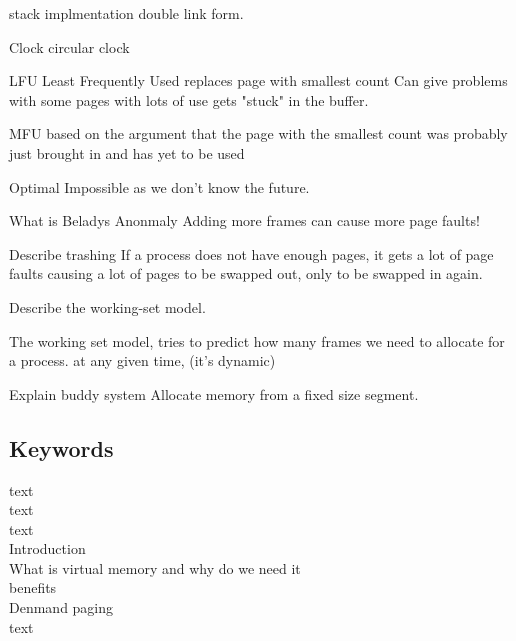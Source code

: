 \documentclass[a4paper,10pt,titlepage]{report}
\begin{document}
stack implmentation 
    double link form.
    
    
    
Clock
circular clock 



LFU
Least Frequently Used
replaces page with smallest count
Can give problems with some pages with lots of use gets "stuck" in the buffer.

MFU
based on the argument that the page with the smallest count was probably just brought in and has yet to be used

Optimal
    Impossible as we don't know the future.

What is Beladys Anonmaly
Adding more frames can cause more page faults!

Describe trashing
If a process does not have enough pages, it gets a lot of page faults causing a lot of pages to be swapped out, only to be swapped in again.



Describe the working-set model.

The working set model, tries to predict how many frames we need to allocate for a process. at any given time, (it's dynamic)

Explain buddy system
Allocate memory from a fixed size segment.










\subsection{Keywords}
\hspace{10mm} text \\
\hspace{15mm} text \\
\hspace{20mm} text \\

\vspace{5mm}
Introduction \\
\hspace{10mm} What is virtual memory and why do we need it \\
\hspace{10mm} benefits \\

\vspace{5mm}
Denmand paging \\
\hspace{10mm} text \\
\vspace{5mm}
\end{document}
